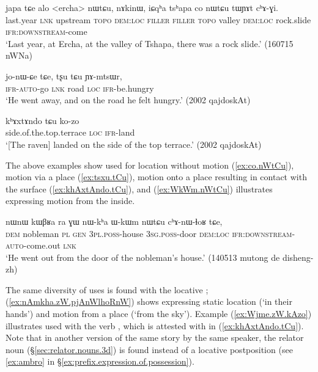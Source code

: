 \begin{exe}
\ex \label{ex:co.nWtCu}
\gll japa tɕe alo <ercha> nɯtɕu, nɤkinɯ, iɕqʰa tsʰapa co nɯtɕu tɯɲɤt cʰɤ-ɣi. \\
last.year \textsc{lnk} upstream  \textsc{topo} \textsc{dem}:\textsc{loc} \textsc{filler}   \textsc{filler}   \textsc{topo} valley \textsc{dem}:\textsc{loc} rock.slide \textsc{ifr}:\textsc{downstream}-come \\
\glt `Last year, at Ercha, at the valley of Tshapa, there was a rock slide.' (160715 nWNa)
\end{exe}

\begin{exe}
\ex \label{ex:tsxu.tCu}
\gll jo-nɯ-ɕe tɕe, tʂu tɕu ɲɤ-mtsɯr, \\
\textsc{ifr}-\textsc{auto}-go \textsc{lnk} road \textsc{loc} \textsc{ifr}-be.hungry \\
\glt `He went away, and on the road he felt hungry.' (2002 qajdoskAt)
\end{exe}

\begin{exe}
\ex \label{ex:khAxtAndo.tCu}
\gll  kʰɤxtɤndo tɕu ko-zo \\
side.of.the.top.terrace \textsc{loc} \textsc{ifr}-land \\
\glt `[The raven] landed on the side of the top terrace.' (2002 qajdoskAt)
\end{exe}

The above examples show  used for location without motion (\ref{ex:co.nWtCu}), motion via a place (\ref{ex:tsxu.tCu}), motion onto a place resulting in contact with the surface (\ref{ex:khAxtAndo.tCu}), and (\ref{ex:WkWm.nWtCu}) illustrates  expressing motion from the inside.

\begin{exe}
\ex \label{ex:WkWm.nWtCu}
\gll nɯnɯ kɯβʁa ra ɣɯ nɯ-kʰa ɯ-kɯm nɯtɕu cʰɤ-nɯ-ɬoʁ tɕe, \\
\textsc{dem} nobleman \textsc{pl} \textsc{gen} \textsc{3pl}.\textsc{poss}-house \textsc{3sg}.\textsc{poss}-door \textsc{dem}:\textsc{loc} \textsc{ifr}:\textsc{downstream}-\textsc{auto}-come.out \textsc{lnk} \\
\glt  `He went out from the door of the nobleman's house.' (140513 mutong de disheng-zh)
\end{exe}

The same diversity of uses is found with the locative ; (\ref{ex:nAmkha.zW.pjAnWlhoRnW}) shows  expressing static location (`in their hands') and motion from a place (`from the sky').  Example (\ref{ex:Wjme.zW.kAzo}) illustrates  used with the verb , which is attested with  in (\ref{ex:khAxtAndo.tCu}). Note that in another version of the same story by the same speaker, the relator noun  (§\ref{sec:relator.nouns.3d}) is found instead of a locative postposition (see \ref{ex:ambro} in §\ref{ex:prefix.expression.of.possession}).

